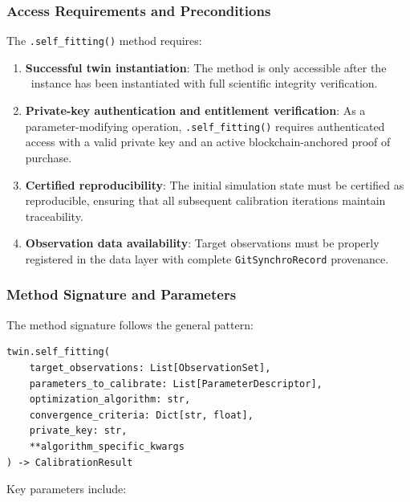 \subsubsection{Access Requirements and Preconditions}

The \texttt{.self\_fitting()} method requires:

\begin{enumerate}
\item \textbf{Successful twin instantiation}: The method is only accessible after the \hydrot\ instance has been instantiated with full scientific integrity verification.

\item \textbf{Private-key authentication and entitlement verification}: As a parameter-modifying operation, \texttt{.self\_fitting()} requires authenticated access with a valid private key and an active blockchain-anchored proof of purchase.

\item \textbf{Certified reproducibility}: The initial simulation state must be certified as reproducible, ensuring that all subsequent calibration iterations maintain traceability.

\item \textbf{Observation data availability}: Target observations must be properly registered in the data layer with complete \texttt{GitSynchroRecord} provenance.
\end{enumerate}

\subsubsection{Method Signature and Parameters}

The method signature follows the general pattern:

\begin{verbatim}
twin.self_fitting(
    target_observations: List[ObservationSet],
    parameters_to_calibrate: List[ParameterDescriptor],
    optimization_algorithm: str,
    convergence_criteria: Dict[str, float],
    private_key: str,
    **algorithm_specific_kwargs
) -> CalibrationResult
\end{verbatim}

Key parameters include:

